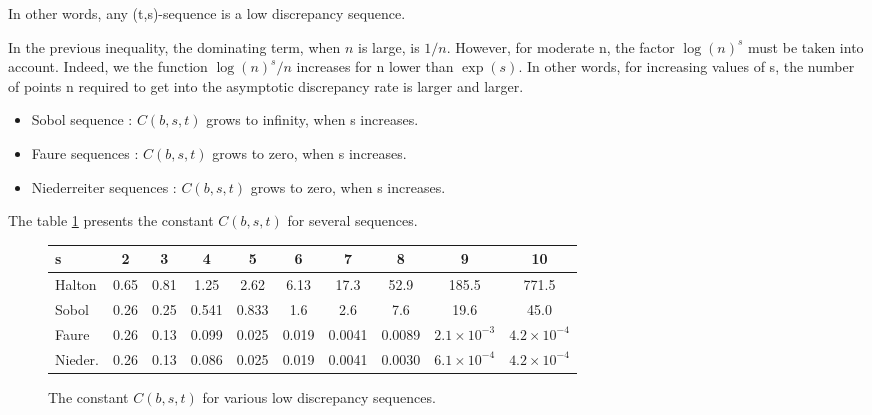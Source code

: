 In other words, any (t,s)-sequence is a low discrepancy sequence.

In the previous inequality, the dominating term, when $n$ is large, is $1/n$.
However, for moderate n, the factor $\log(n)^s$ must be taken into account.
Indeed, we the function $\log(n)^s/n$ increases for n lower than $\exp(s)$.
In other words, for increasing values of s, the number of points n
required to get into the asymptotic discrepancy rate is larger and larger.


\begin{itemize}
        
\item Sobol sequence : $C(b,s,t)$ grows to infinity, when s increases.
        
\item Faure sequences : $C(b,s,t)$ grows to zero, when s increases.
        
\item Niederreiter sequences : $C(b,s,t)$ grows to zero, when s increases.
\end{itemize}



The table \ref{fig-Cbst-halsofanied} presents the constant $C(b,s,t)$ for several
sequences.

\begin{figure}
\begin{center}
\begin{tabular}{l|ccccccccc}
s       & 2     & 3     & 4     & 5     & 6     & 7      & 8      & 9        & 10       \\
\hline
Halton  & 0.65  & 0.81  & 1.25  & 2.62  & 6.13  & 17.3   & 52.9   & 185.5    & 771.5    \\
Sobol   & 0.26  & 0.25  & 0.541 & 0.833 & 1.6   & 2.6    & 7.6    & 19.6     & 45.0     \\
Faure   & 0.26  & 0.13  & 0.099 & 0.025 & 0.019 & 0.0041 & 0.0089 & $2.1\times 10^{-3}$ & $4.2\times 10^{-4}$ \\
Nieder. & 0.26  & 0.13  & 0.086 & 0.025 & 0.019 & 0.0041 & 0.0030 & $6.1\times 10^{-4}$ & $4.2\times 10^{-4}$ \\
\end{tabular}
\end{center}
\caption{The constant $C(b,s,t)$ for various low discrepancy sequences.}
\label{fig-Cbst-halsofanied}
\end{figure}



